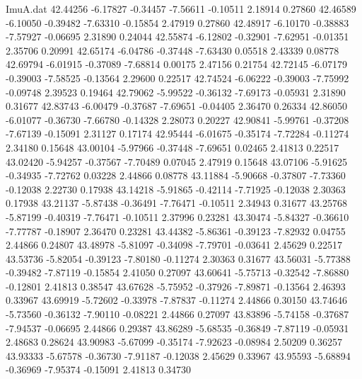 \begin{filecontents}{ImuA.dat}
  42.44256   -6.17827   -0.34457   -7.56611   -0.10511    2.18914    0.27860
  42.46589   -6.10050   -0.39482   -7.63310   -0.15854    2.47919    0.27860
  42.48917   -6.10170   -0.38883   -7.57927   -0.06695    2.31890    0.24044
  42.55874   -6.12802   -0.32901   -7.62951   -0.01351    2.35706    0.20991
  42.65174   -6.04786   -0.37448   -7.63430    0.05518    2.43339    0.08778
  42.69794   -6.01915   -0.37089   -7.68814    0.00175    2.47156    0.21754
  42.72145   -6.07179   -0.39003   -7.58525   -0.13564    2.29600    0.22517
  42.74524   -6.06222   -0.39003   -7.75992   -0.09748    2.39523    0.19464
  42.79062   -5.99522   -0.36132   -7.69173   -0.05931    2.31890    0.31677
  42.83743   -6.00479   -0.37687   -7.69651   -0.04405    2.36470    0.26334
  42.86050   -6.01077   -0.36730   -7.66780   -0.14328    2.28073    0.20227
  42.90841   -5.99761   -0.37208   -7.67139   -0.15091    2.31127    0.17174
  42.95444   -6.01675   -0.35174   -7.72284   -0.11274    2.34180    0.15648
  43.00104   -5.97966   -0.37448   -7.69651    0.02465    2.41813    0.22517
  43.02420   -5.94257   -0.37567   -7.70489    0.07045    2.47919    0.15648
  43.07106   -5.91625   -0.34935   -7.72762    0.03228    2.44866    0.08778
  43.11884   -5.90668   -0.37807   -7.73360   -0.12038    2.22730    0.17938
  43.14218   -5.91865   -0.42114   -7.71925   -0.12038    2.30363    0.17938
  43.21137   -5.87438   -0.36491   -7.76471   -0.10511    2.34943    0.31677
  43.25768   -5.87199   -0.40319   -7.76471   -0.10511    2.37996    0.23281
  43.30474   -5.84327   -0.36610   -7.77787   -0.18907    2.36470    0.23281
  43.44382   -5.86361   -0.39123   -7.82932    0.04755    2.44866    0.24807
  43.48978   -5.81097   -0.34098   -7.79701   -0.03641    2.45629    0.22517
  43.53736   -5.82054   -0.39123   -7.80180   -0.11274    2.30363    0.31677
  43.56031   -5.77388   -0.39482   -7.87119   -0.15854    2.41050    0.27097
  43.60641   -5.75713   -0.32542   -7.86880   -0.12801    2.41813    0.38547
  43.67628   -5.75952   -0.37926   -7.89871   -0.13564    2.46393    0.33967
  43.69919   -5.72602   -0.33978   -7.87837   -0.11274    2.44866    0.30150
  43.74646   -5.73560   -0.36132   -7.90110   -0.08221    2.44866    0.27097
  43.83896   -5.74158   -0.37687   -7.94537   -0.06695    2.44866    0.29387
  43.86289   -5.68535   -0.36849   -7.87119   -0.05931    2.48683    0.28624
  43.90983   -5.67099   -0.35174   -7.92623   -0.08984    2.50209    0.36257
  43.93333   -5.67578   -0.36730   -7.91187   -0.12038    2.45629    0.33967
  43.95593   -5.68894   -0.36969   -7.95374   -0.15091    2.41813    0.34730

\end{filecontents}
